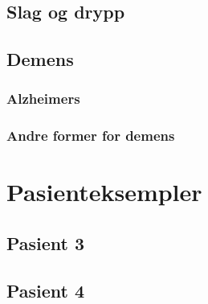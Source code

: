 			\subsection{Slag og drypp}
			\subsection{Demens}
				\subsubsection{Alzheimers}
				\subsubsection{Andre former for demens}
		\section{Pasienteksempler}
			\subsection{Pasient 3}
			\subsection{Pasient 4}


\newpage
